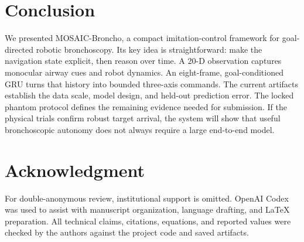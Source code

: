 \documentclass[letterpaper,10pt,conference]{ieeeconf}
\begin{document}
\section{Conclusion}

We presented MOSAIC-Broncho, a compact imitation-control framework for
goal-directed robotic bronchoscopy. Its key idea is straightforward: make the
navigation state explicit, then reason over time. A 20-D observation captures
monocular airway cues and robot dynamics. An eight-frame, goal-conditioned GRU
turns that history into bounded three-axis commands. The current artifacts
establish the data scale, model design, and held-out prediction error. The
locked phantom protocol defines the remaining evidence needed for submission.
If the physical trials confirm robust target arrival, the system will show that
useful bronchoscopic autonomy does not always require a large end-to-end model.

\section*{Acknowledgment}
For double-anonymous review, institutional support is omitted. OpenAI Codex was
used to assist with manuscript organization, language drafting, and LaTeX
preparation. All technical claims, citations, equations, and reported values
were checked by the authors against the project code and saved artifacts.



\end{document}
